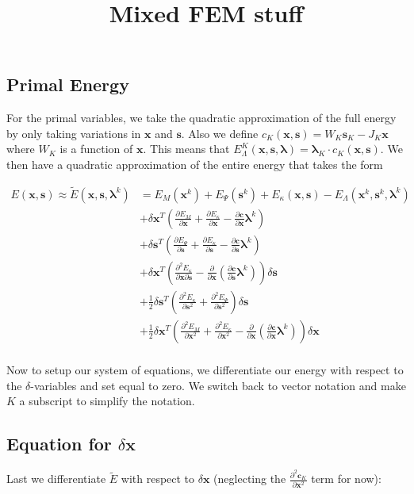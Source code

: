 \documentclass[letterpaper,12pt]{article}
\theoremstyle{remark}
\newcommand{\x}{\mathbf{x}}
\newcommand{\C}{\mathbf{c}}
\newcommand{\s}{\mathbf{s}}
\newcommand{\la}{\mathbf{\lambda}}
\newcommand{\dx}{\delta \x}
\newcommand{\ds}{\delta \s}
\newcommand{\El}{E_\Lambda}
\begin{document}
\title{Mixed FEM stuff}
\date{}
\maketitle





%


\subsection{Primal Energy}
For the primal variables, we take the quadratic approximation of the full energy by only taking variations in $\x$ and $\s$. Also we define $c_K(\x,\s) = W_K \s_K - J_K \x$ where $W_K$ is a function of $\x$. This means that $\El^K(\x,\s,\la) = \la_K \cdot c_K(\x,\s)$. We then have a quadratic approximation of the entire energy that takes the form

\begin{align*}
E(\x,\s) \approx \tilde{E}(\x,\s,\la^k) &= E_M(\x^k) + E_\Psi(\s^k) + E_\kappa(\x, \s) - \El(\x^k,\s^k,\la^k) \\
&+ 
\dx^T \left(
	\frac{\partial E_M}{\partial \x} 
 +  \frac{\partial E_\kappa}{\partial \x} 
 -  \frac{\partial \C}{\partial \x} \la^k \right) & \\
&+ \ds^T \left(
	\frac{\partial E_\Psi}{\partial \s} 
+  \frac{\partial E_\kappa}{\partial \s} 
 -  \frac{\partial \C}{\partial \s} \la^k \right)  & \\
& + \dx^T \left(
  \frac{\partial^2 E_\kappa}{\partial \x \partial \s}
 - \frac{\partial}{\partial \x} \left(\frac{\partial \C}{\partial \s} \la^k\right) \right)\ds & \\
& + \frac{1}{2} \ds^T \left(
 \frac{\partial^2 E_\kappa}{\partial \s^2}
 + \frac{\partial^2 E_\Psi}{\partial \s^2}
 \right)\ds & \\
& + \frac{1}{2}\dx^T \left(\frac{\partial^2 E_M}{\partial \x^2} 
+ \frac{\partial^2 E_\kappa}{\partial \x^2}
- \frac{\partial}{\partial \x} \left(\frac{\partial \C}{\partial \x} \la^k\right)
\right)\dx & \\
\end{align*}


Now to setup our system of equations, we differentiate our energy with respect to the $\delta$-variables and set equal to zero. We switch back to vector notation and make $K$ a subscript to simplify the notation.

\subsection{Equation for $\dx$}
Last we differentiate $\tilde{E}$ with respect to $\dx$ (neglecting the $\frac{\partial^2 \C_K}{ \partial \x^2}$ term for now):
\end{document}
